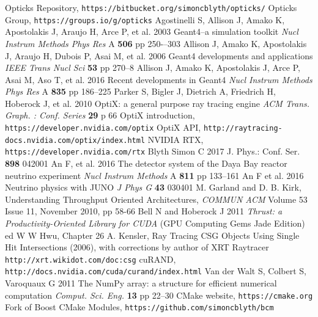 \documentclass{webofc}
\begin{document}
\begin{thebibliography}{}
%
Opticks Repository, {\tt https://bitbucket.org/simoncblyth/opticks/}
Opticks Group, {\tt https://groups.io/g/opticks}
Agostinelli S, Allison J, Amako K, Apostolakis J, Araujo H, Arce P, et al.
2003
Geant4--a simulation toolkit
{\it Nucl Instrum Methods Phys Res} A {\bf 506} pp 250-–303
Allison J, Amako K, Apostolakis J, Araujo H, Dubois P, Asai M, et al.
2006
Geant4 developments and applications
{\it IEEE Trans Nucl Sci} {\bf 53} pp 270--8
Allison J, Amako K, Apostolakis J, Arce P, Asai M, Aso T, et al.
2016
Recent developments in Geant4
{\it Nucl Instrum Methods Phys Res} A {\bf 835} pp 186--225
Parker S, Bigler J, Dietrich A, Friedrich H, Hoberock J, et al.
2010
OptiX: a general purpose ray tracing engine
{\it ACM Trans. Graph. : Conf. Series} {\bf 29} p 66
OptiX introduction, {\tt https://developer.nvidia.com/optix}
OptiX API, {\tt http://raytracing-docs.nvidia.com/optix/index.html}
NVIDIA RTX, {\tt https://developer.nvidia.com/rtx}
Blyth Simon C 2017 J. Phys.: Conf. Ser. {\bf 898} 042001
An F, et al.
2016
The detector system of the Daya Bay reactor neutrino experiment
{\it Nucl Instrum Methods} A {\bf 811} pp 133--161
An F et al.
2016
Neutrino physics with JUNO
{\it J Phys G} {\bf 43} 030401
M. Garland and D. B. Kirk, Understanding Throughput Oriented Architectures, 
{\it COMMUN ACM} Volume 53 Issue 11, November 2010, pp 58-66  	
Bell N and Hoberock J 
2011
{\it Thrust: a Productivity-Oriented Library for CUDA}
(GPU Computing Gems Jade Edition) ed W W Hwu, Chapter 26
A. Kensler, Ray Tracing CSG Objects Using Single Hit Intersections (2006), 
with corrections by author of XRT Raytracer {\tt http://xrt.wikidot.com/doc:csg}
cuRAND, {\tt http://docs.nvidia.com/cuda/curand/index.html}
Van der Walt S, Colbert S, Varoquaux G 
2011 
The NumPy array: a structure for efficient numerical computation
{\it Comput. Sci. Eng.} {\bf 13} pp 22--30
CMake website, {\tt https://cmake.org}
Fork of Boost CMake Modules,  {\tt https://github.com/simoncblyth/bcm}
%
\end{thebibliography}
%
\end{document}

